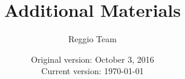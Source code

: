 

\setcounter{table}{0}
\renewcommand{\thetable}{A\arabic{table}}





\title{\Large \textbf{Additional Materials}}
\author{\normalsize Reggio Team}
\date{\normalsize Original version: October 3, 2016 \\ Current version: \today}
\maketitle

\tableofcontents

\doublespacing


